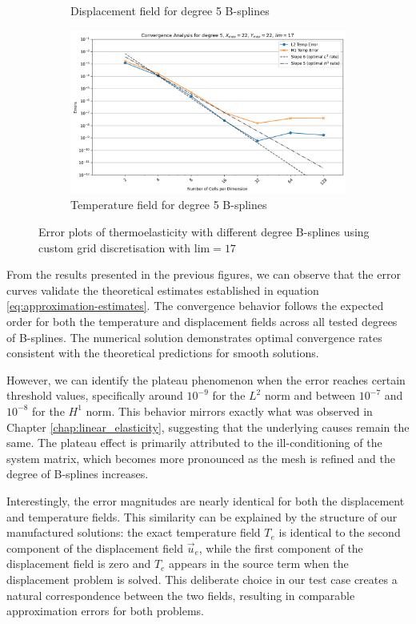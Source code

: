 \documentclass[a4paper,12pt,twoside]{report}
\begin{document}
\begin{figure}[!h]
\begin{subfigure}[b]{0.49\textwidth}
		\caption{Displacement field for degree 5 B-splines}
		\label{fig:disp_d5_lim_17}
	\end{subfigure}
	\begin{subfigure}[b]{0.49\textwidth}
		\includegraphics[width=\textwidth]{figures/figures_thermoelas_degree/Temp_X_max=22_Y_max=22_lim=17_d=5.png}
		\caption{Temperature field for degree 5 B-splines}
		\label{fig:temp_d5_lim_17}
	\end{subfigure}
	\caption{Error plots of thermoelasticity with different degree B-splines using custom grid discretisation with $\text{lim} = 17$}
\end{figure}

From the results presented in the previous figures, we can observe that the error curves validate the theoretical estimates established in equation \eqref{eq:approximation-estimates}. The convergence behavior follows the expected order for both the temperature and displacement fields across all tested degrees of B-splines. The numerical solution demonstrates optimal convergence rates consistent with the theoretical predictions for smooth solutions.

However, we can identify the plateau phenomenon when the error reaches certain threshold values, specifically around $10^{-9}$ for the $L^2$ norm and between $10^{-7}$ and $10^{-8}$ for the $H^1$ norm. This behavior mirrors exactly what was observed in Chapter \ref{chap:linear_elasticity}, suggesting that the underlying causes remain the same. The plateau effect is primarily attributed to the ill-conditioning of the system matrix, which becomes more pronounced as the mesh is refined and the degree of B-splines increases.

Interestingly, the error magnitudes are nearly identical for both the displacement and temperature fields. This similarity can be explained by the structure of our manufactured solutions: the exact temperature field $T_e$ is identical to the second component of the displacement field $\vec{u}_e$, while the first component of the displacement field is zero and $T_e$ appears in the source term when the displacement problem is solved. This deliberate choice in our test case creates a natural correspondence between the two fields, resulting in comparable approximation errors for both problems.
\end{document}
